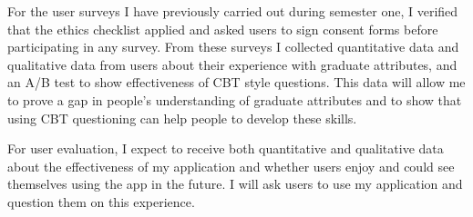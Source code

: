 \documentclass[11pt]{article}
\begin{document}
For the user surveys I have previously carried out during semester one, I verified that the ethics checklist applied and asked users to sign consent forms before participating in any survey. From these surveys I collected quantitative data and qualitative data from users about their experience with graduate attributes, and an A/B test to show effectiveness of CBT style questions. This data will allow me to prove a gap in people's understanding of graduate attributes and to show that using CBT questioning can help people to develop these skills.
  
For user evaluation, I expect to receive both quantitative and qualitative data about the effectiveness of my application and whether users enjoy and could see themselves using the app in the future. I will ask users to use my application and question them on this experience.
\end{document}
